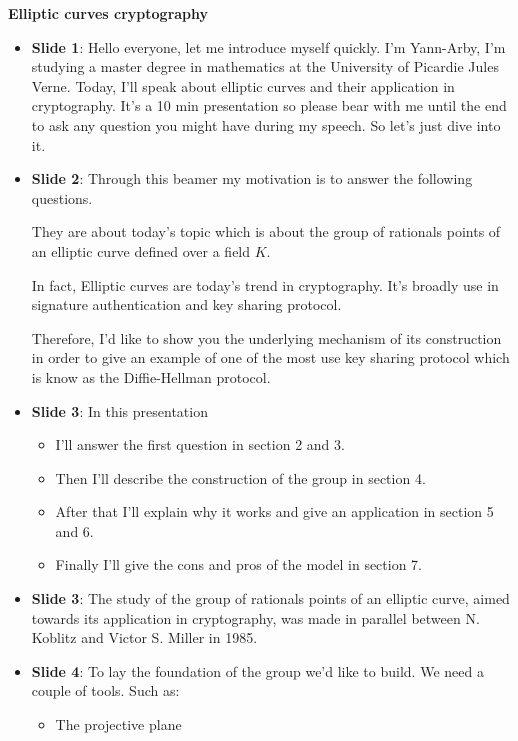 \begin{center}
    \textbf{Elliptic curves cryptography}
\end{center}
\begin{itemize}
    \item \textbf{Slide 1}: Hello everyone, let me introduce myself quickly. I'm
        Yann-Arby, I'm studying a master degree in mathematics at the University of Picardie Jules
        Verne. Today, I'll speak about elliptic curves and their
        application in cryptography. It's a 10 min presentation so please bear with
        me until the end to ask any question you might have during my speech. So let's just
        dive into it.
    \item \textbf{Slide 2}: Through this beamer my motivation is to answer the
        following questions.

        They are about today's topic which is about the group of rationals points of
            an elliptic curve defined over a field $K$. 

            In fact, Elliptic curves are today's
            trend in cryptography. It's broadly use in signature authentication and key
            sharing protocol. 

            Therefore, I'd like to show you the underlying
            mechanism of its construction in order to give an example of one of the most use key
            sharing protocol which is know as the Diffie-Hellman protocol. 
        \item \textbf{Slide 3}:
            In this presentation
            \begin{itemize}
                \item I'll answer the first question in
                    section 2 and 3.
                \item Then I'll describe the construction of the group in section 4.
                \item After that I'll explain why it works and give an application in section 5 and 6.
                \item Finally I'll give the cons and pros of the model in section 7.
            \end{itemize}
        \item \textbf{Slide 3}: The study of the group of rationals points of an
            elliptic curve, aimed towards its application in cryptography, was made in
            parallel between N. Koblitz and Victor S. Miller in 1985.
        \item \textbf{Slide 4}: To lay the foundation of the group we'd like to
            build. We need a couple of tools.
            Such as:
            \begin{itemize}
                \item The projective plane


\end{itemize}
\end{itemize}
